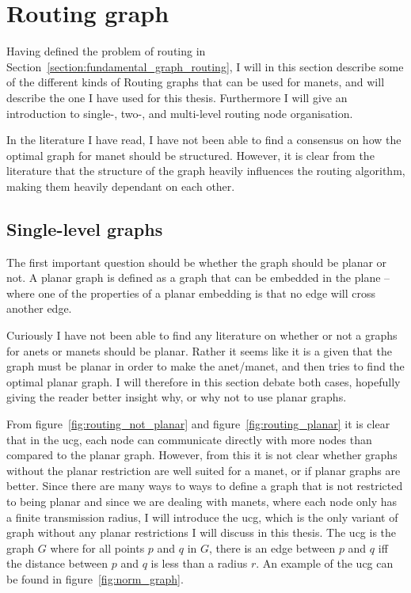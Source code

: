 \section{Routing graph}
\label{section:routing_graph}

Having defined the problem of routing in Section~\ref{section:fundamental_graph_routing}, I will in this section describe some of the different kinds of Routing graphs that can be used for \acp{manet}, and will describe the one I have used for this thesis. Furthermore I will give an introduction to single-, two-, and multi-level routing node organisation. 

In the literature I have read, I have not been able to find a consensus on how the optimal graph for \ac{manet} should be structured. However, it is clear from the literature that the structure of the graph heavily influences the routing algorithm, making them heavily dependant on each other. 

\subsection{Single-level graphs}
\label{single_level}
The first important question should be whether the graph should be planar or not. A planar graph is defined as a graph that can be embedded in the plane -- where one of the properties of a planar embedding is that no edge will cross another edge.

Curiously I have not been able to find any literature on whether or not a graphs for \acp{anet} or \acp{manet} should be planar. Rather it seems like it is a given that the graph must be planar in order to make the \ac{anet}/\ac{manet}, and then tries to find the optimal planar graph. I will therefore in this section debate both cases, hopefully giving the reader better insight why, or why not to use planar graphs.

From figure~\ref{fig:routing_not_planar} and figure~\ref{fig:routing_planar} it is clear that in the \ac{ucg}, each node can communicate directly with more nodes than compared to the planar graph. However, from this it is not clear whether graphs without the planar restriction are well suited for a \ac{manet}, or if planar graphs are better. Since there are many ways to ways to define a graph that is not restricted to being planar and since we are dealing with \acp{manet}, where each node only has a finite transmission radius, I will introduce the \ac{ucg}, which is the only variant of graph without any planar restrictions I will discuss in this thesis. The \ac{ucg} is the graph $G$ where for all points $p$ and $q$ in $G$, there is an edge between $p$ and $q$ iff the distance between $p$ and $q$ is less than a radius $r$. An example of the \ac{ucg} can be found in figure~\ref{fig:norm_graph}. 

